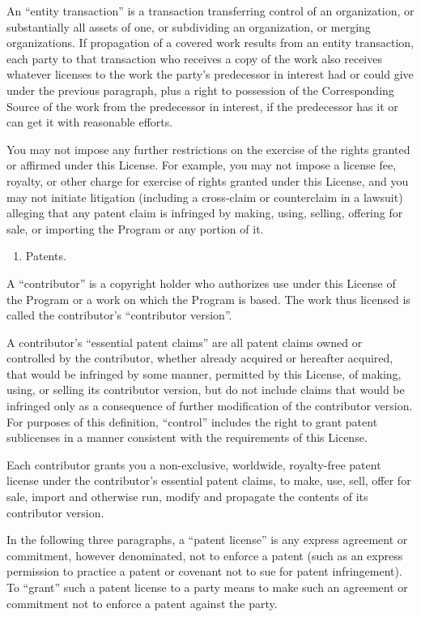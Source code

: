 \documentclass[11pt]{article}
\begin{document}
An “entity transaction” is a transaction transferring control of an organization, or substantially all assets of one, or subdividing an organization, or merging organizations. If propagation of a covered work results from an entity transaction, each party to that transaction who receives a copy of the work also receives whatever licenses to the work the party's predecessor in interest had or could give under the previous paragraph, plus a right to possession of the Corresponding Source of the work from the predecessor in interest, if the predecessor has it or can get it with reasonable efforts.

You may not impose any further restrictions on the exercise of the rights granted or affirmed under this License. For example, you may not impose a license fee, royalty, or other charge for exercise of rights granted under this License, and you may not initiate litigation (including a cross-claim or counterclaim in a lawsuit) alleging that any patent claim is infringed by making, using, selling, offering for sale, or importing the Program or any portion of it.

\begin{enumerate}
\item Patents.
\end{enumerate}
A “contributor” is a copyright holder who authorizes use under this License of the Program or a work on which the Program is based. The work thus licensed is called the contributor's “contributor version”.

A contributor's “essential patent claims” are all patent claims owned or controlled by the contributor, whether already acquired or hereafter acquired, that would be infringed by some manner, permitted by this License, of making, using, or selling its contributor version, but do not include claims that would be infringed only as a consequence of further modification of the contributor version. For purposes of this definition, “control” includes the right to grant patent sublicenses in a manner consistent with the requirements of this License.

Each contributor grants you a non-exclusive, worldwide, royalty-free patent license under the contributor's essential patent claims, to make, use, sell, offer for sale, import and otherwise run, modify and propagate the contents of its contributor version.

In the following three paragraphs, a “patent license” is any express agreement or commitment, however denominated, not to enforce a patent (such as an express permission to practice a patent or covenant not to sue for patent infringement). To “grant” such a patent license to a party means to make such an agreement or commitment not to enforce a patent against the party.
\end{document}
